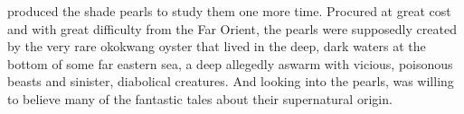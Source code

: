 %
%
%
%
%
%
%
\Filgzed{} produced the shade pearls to study them one more time. Procured at great cost and with great difficulty from the Far Orient, the pearls were supposedly created by the very rare okokwang oyster that lived in the deep, dark waters at the bottom of some far eastern sea, a deep allegedly aswarm with vicious, poisonous beasts and sinister, diabolical creatures. And looking into the pearls, \Filgzed{} was willing to believe many of the fantastic tales about their supernatural origin. 

